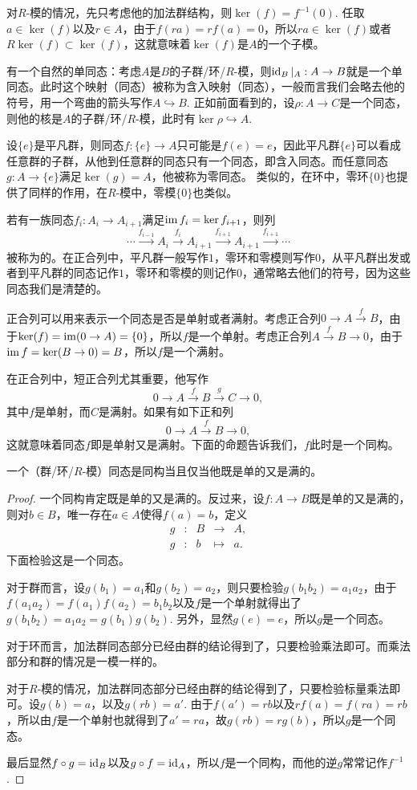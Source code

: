 对$R$-模的情况，先只考虑他的加法群结构，则$\ker(f)=f^{-1}(0)$. 任取$a\in \ker(f)$以及$r\in A$，由于$f(ra)=rf(a)=0$，所以$ra\in \ker(f)$或者$R\ker(f)\subset \ker(f)$，这就意味着$\ker(f)$是$A$的一个子模。

\para 有一个自然的单同态：考虑$A$是$B$的子群/环/$R$-模，则$\operatorname{id}_B|_A:A\to B$就是一个单同态。此时这个映射（同态）被称为含入映射（同态），一般而言我们会略去他的符号，用一个弯曲的箭头写作$A\hookrightarrow B$. 正如前面看到的，设$\rho:A\to C$是一个同态，则他的核是$A$的子群/环/$R$-模，此时有$\ker\rho\hookrightarrow A$.

设$\{e\}$是平凡群，则同态$f:\{e\}\to A$只可能是$f(e)=e$，因此平凡群$\{e\}$可以看成任意群的子群，从他到任意群的同态只有一个同态，即含入同态。而任意同态$g:A\to \{e\}$满足$\ker(g)=A$，他被称为零同态。 类似的，在环中，零环$\{0\}$也提供了同样的作用，在$R$-模中，零模$\{0\}$也类似。

\para 若有一族同态$f_i:A_i\to A_{i+1}$满足$\operatorname{im} f_i=\ker f_{i+1}$，则列
\[
	\cdots \xrightarrow{f_{i-1}}A_i \xrightarrow{f_i} A_{i+1} \xrightarrow{f_{i+1}} A_{i+1}\xrightarrow{f_{i+1}}\cdots
\]
被称为的。在正合列中，平凡群一般写作$1$，零环和零模则写作$0$，从平凡群出发或者到平凡群的同态记作$1$，零环和零模的则记作$0$，通常略去他们的符号，因为这些同态我们是清楚的。

正合列可以用来表示一个同态是否是单射或者满射。考虑正合列$0\to A\xrightarrow{f} B$，由于$\ker(f)=\operatorname{im}(0\to A)=\{0\}$，所以$f$是一个单射。考虑正合列$A\xrightarrow{f} B\to 0$，由于$\operatorname{im} f=\ker(B\to 0)=B$，所以$f$是一个满射。

在正合列中，短正合列尤其重要，他写作
\[
	0\to A \xrightarrow{f} B \xrightarrow{g} C\to 0,
\]
其中$f$是单射，而$C$是满射。如果有如下正和列
\[
	0\to A \xrightarrow{f} B \to 0,
\]
这就意味着同态$f$即是单射又是满射。下面的命题告诉我们，$f$此时是一个同构。

\begin{pro}
一个（群/环/$R$-模）同态是同构当且仅当他既是单的又是满的。
\end{pro}

\begin{proof}
一个同构肯定既是单的又是满的。反过来，设$f: A\to B$既是单的又是满的，则对$b\in B$，唯一存在$a\in A$使得$f(a)=b$，定义
\[
	\begin{array}{ccccc}
		g &:&B &\to& A,\\
		g &:&b &\mapsto& a.
	\end{array}
\]
下面检验这是一个同态。

对于群而言，设$g(b_1)=a_1$和$g(b_2)=a_2$，则只要检验$g(b_1b_2)=a_1a_2$，由于$f(a_1a_2)=f(a_1)f(a_2)=b_1b_2$以及$f$是一个单射就得出了$g(b_1b_2)=a_1a_2=g(b_1)g(b_2)$. 另外，显然$g(e)=e$，所以$g$是一个同态。

对于环而言，加法群同态部分已经由群的结论得到了，只要检验乘法即可。而乘法部分和群的情况是一模一样的。

对于$R$-模的情况，加法群同态部分已经由群的结论得到了，只要检验标量乘法即可。设$g(b)=a$，以及$g(rb)=a'$. 由于$f(a')=rb$以及$rf(a)=f(ra)=rb$，所以由$f$是一个单射也就得到了$a'=ra$，故$g(rb)=rg(b)$，所以$g$是一个同态。

最后显然$f\circ g =\operatorname{id}_B$以及$g\circ f=\operatorname{id}_A$，所以$f$是一个同构，而他的逆$g$常常记作$f^{-1}$.
\end{proof}


